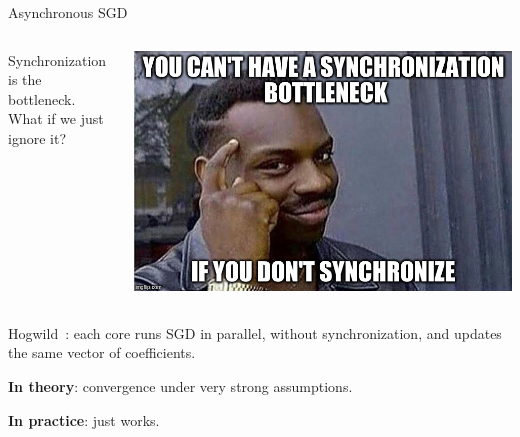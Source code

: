 \documentclass[10pt]{beamer}
\let\oldparencite=\parencite
\renewcommand{\parencite}[1]{\textcolor[rgb]{.7,.7,.7}{\oldparencite{#1}}}
\begin{document}
\begin{frame}{Asynchronous SGD}

\begin{columns}
\begin{column}{0.5\textwidth}  %
Synchronization is the bottleneck. \\

\vspace{1em}{\Large\faLightbulbO~}What if we just ignore it?
\end{column}
\begin{column}{0.5\textwidth}  %
\begin{center}
\includegraphics[width=\linewidth]{img/synchronization}
\end{center}
\end{column}
\end{columns}

\pause
Hogwild~\parencite{hogwild2011}: each core runs SGD in parallel, without synchronization, and updates the same vector of coefficients.

{\bfseries In theory}: convergence under very strong assumptions.

{\bfseries In practice}: just works.

\end{frame}
\end{document}
